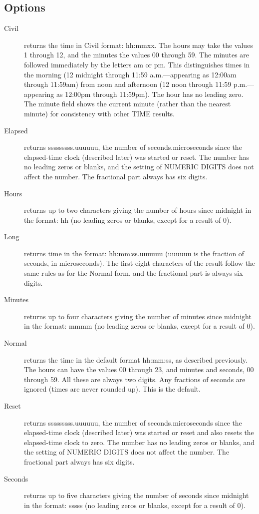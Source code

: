 \subsection{Options}
\begin{description}
 \item[Civil]
returns the time in Civil format: hh:mmxx. The hours may take the values 1 through 12, and the minutes the values 00 through 59. The minutes are followed immediately by the letters am or pm. This distinguishes times in the morning (12 midnight through 11:59 a.m.—appearing as 12:00am through 11:59am) from noon and afternoon (12 noon through 11:59 p.m.—appearing as 12:00pm through 11:59pm). The hour has no leading zero. The minute field shows the current minute (rather than the nearest minute) for consistency with other TIME results.
 \item[Elapsed]
returns sssssssss.uuuuuu, the number of seconds.microseconds since the elapsed-time clock (described later) was started or reset. The number has no leading zeros or blanks, and the setting of NUMERIC DIGITS does not affect the number. The fractional part always has six digits.
 \item[Hours]
returns up to two characters giving the number of hours since midnight in the format: hh (no leading zeros or blanks, except for a result of 0).
 \item[Long]
returns time in the format: hh:mm:ss.uuuuuu (uuuuuu is the fraction of seconds, in microseconds). The first eight characters of the result follow the same rules as for the Normal form, and the fractional part is always six digits.
 \item[Minutes]
returns up to four characters giving the number of minutes since midnight in the format: mmmm (no leading zeros or blanks, except for a result of 0).
 \item[Normal]
returns the time in the default format hh:mm:ss, as described previously. The hours can have the values 00 through 23, and minutes and seconds, 00 through 59. All these are always two digits. Any fractions of seconds are ignored (times are never rounded up). This is the default.
 \item[Reset]
returns sssssssss.uuuuuu, the number of seconds.microseconds since the elapsed-time clock (described later) was started or reset and also resets the elapsed-time clock to zero. The number has no leading zeros or blanks, and the setting of NUMERIC DIGITS does not affect the number. The fractional part always has six digits.
 \item[Seconds]
returns up to five characters giving the number of seconds since midnight in the format: sssss (no leading zeros or blanks, except for a result of 0).
\end{description}
